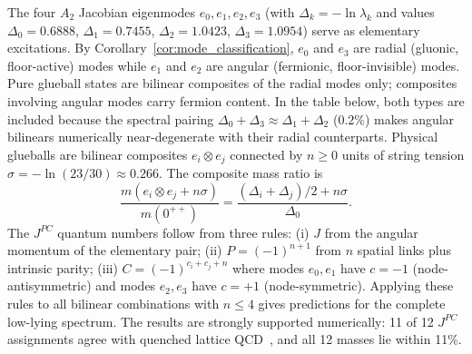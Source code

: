 \documentclass[11pt,a4paper]{article}
\theoremstyle{definition}
\theoremstyle{remark}
\begin{document}
The four $A_2$ Jacobian eigenmodes $e_0,e_1,e_2,e_3$ (with $\Delta_k=-\ln\lambda_k$ and values $\Delta_0=0.6888$, $\Delta_1=0.7455$, $\Delta_2=1.0423$, $\Delta_3=1.0954$) serve as elementary excitations. By Corollary~\ref{cor:mode_classification}, $e_0$ and $e_3$ are radial (gluonic, floor-active) modes while $e_1$ and $e_2$ are angular (fermionic, floor-invisible) modes. Pure glueball states are bilinear composites of the radial modes only; composites involving angular modes carry fermion content. In the table below, both types are included because the spectral pairing $\Delta_0+\Delta_3\approx\Delta_1+\Delta_2$ ($0.2\%$) makes angular bilinears numerically near-degenerate with their radial counterparts. Physical glueballs are bilinear composites $e_i\otimes e_j$ connected by $n\geq 0$ units of string tension $\sigma=-\ln(23/30)\approx 0.266$. The composite mass ratio is
\begin{equation}\label{eq:bilinear_mass}
\frac{m(e_i\otimes e_j + n\sigma)}{m(0^{++})} = \frac{(\Delta_i+\Delta_j)/2 + n\sigma}{\Delta_0}.
\end{equation}
The $J^{PC}$ quantum numbers follow from three rules: (i) $J$ from the angular momentum of the elementary pair; (ii) $P=(-1)^{n+1}$ from $n$ spatial links plus intrinsic parity; (iii) $C=(-1)^{c_i+c_j+n}$ where modes $e_0,e_1$ have $c=-1$ (node-antisymmetric) and modes $e_2,e_3$ have $c=+1$ (node-symmetric). Applying these rules to all bilinear combinations with $n\leq 4$ gives predictions for the complete low-lying spectrum. The results are strongly supported numerically: 11 of 12 $J^{PC}$ assignments agree with quenched lattice QCD~\cite{Chen2006}, and all 12 masses lie within 11\%.
\end{document}
